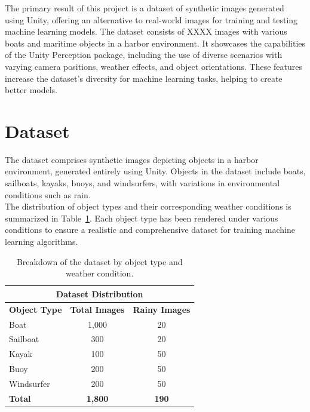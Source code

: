 The primary result of this project is a dataset of synthetic images generated using Unity, offering an alternative to real-world images for training and testing machine learning models. The dataset consists of XXXX images with various boats and maritime objects in a harbor environment. It showcases the capabilities of the Unity Perception package, including the use of diverse scenarios with varying camera positions, weather effects, and object orientations. These features increase the dataset's diversity for machine learning tasks, helping to create better models.

\section{Dataset}
The dataset comprises synthetic images depicting objects in a harbor environment, generated entirely using Unity. Objects in the dataset include boats, sailboats, kayaks, buoys, and windsurfers, with variations in environmental conditions such as rain.\\

\noindent The distribution of object types and their corresponding weather conditions is summarized in Table~\ref{tab:dataset_composition}. Each object type has been rendered under various conditions to ensure a realistic and comprehensive dataset for training machine learning algorithms.
 
\begin{table}[H]
\centering
\begin{tabular}{|l|c|c|}
\hline
\multicolumn{3}{|c|}{\textbf{Dataset Distribution}} \\ 
\hline
\textbf{Object Type} & \textbf{Total Images} & \textbf{Rainy Images} \\ 
\hline
Boat         & 1,000  & 20  \\ 
Sailboat     & 300    & 20  \\ 
Kayak        & 100    & 50  \\ 
Buoy         & 200    & 50  \\ 
Windsurfer   & 200    & 50  \\ 
\hline
\textbf{Total}       & \textbf{1,800} & \textbf{190} \\ 
\hline
\end{tabular}
\caption{Breakdown of the dataset by object type and weather condition.}
\label{tab:dataset_composition}
\end{table}



